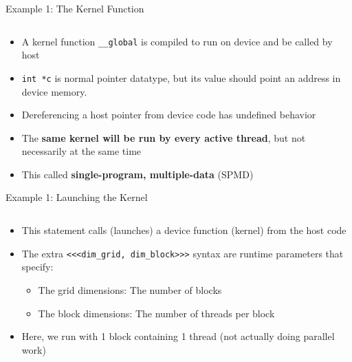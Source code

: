 \documentclass{beamer}
\begin{document}
    \begin{frame}{Example 1:  The Kernel Function}
        \begin{block}{}
            \inputminted[firstline=1,lastline=3]{cuda}{src/01_scalar_add.cu}
        \end{block}
        \begin{itemize}
            \item A kernel function \texttt{\_\_global} is compiled to run on device and be called by host
            \item \texttt{int *c} is normal pointer datatype, but its value should point an address in device memory.
            \item Dereferencing a host pointer from device code has undefined behavior
            \item The \textbf{same kernel will be run by every active thread}, but not necessarily at the same time
            \item This called \textbf{single-program, multiple-data} (SPMD)
        \end{itemize}
    \end{frame}

    \begin{frame}{Example 1: Launching the Kernel}
        \begin{block}{}
            \inputminted[firstline=11,lastline=11]{cuda}{src/01_scalar_add.cu}
        \end{block}
        \begin{itemize}
            \item This statement calls (launches) a device function (kernel) from the host code
            \item The extra \texttt{<<<dim\_grid, dim\_block>>>} syntax are runtime parameters that specify:
            \begin{itemize}
                \item The grid dimensions:  The number of blocks
                \item The block dimensions:  The number of threads per block
            \end{itemize}
            \item Here, we run with 1 block containing 1 thread (not actually doing parallel work)
        \end{itemize}
    \end{frame}
\end{document}
